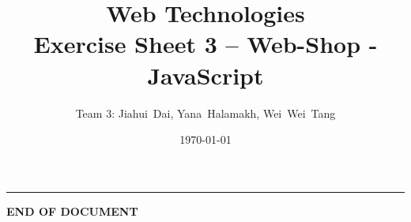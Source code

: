 \documentclass[a4paper,12pt]{article} %
\title{Web Technologies \\
        \large{Exercise Sheet 3 -- Web-Shop - JavaScript}} %
\author{Team 3: Jiahui~Dai, Yana~Halamakh, Wei~Wei~Tang} %
\date{\today} %
\begin{document}
\maketitle %
\hrule %
\tableofcontents %
\newpage











\begin{center}
    \vspace{5em}
    \textbf{END OF DOCUMENT}
\end{center}
\end{document}
